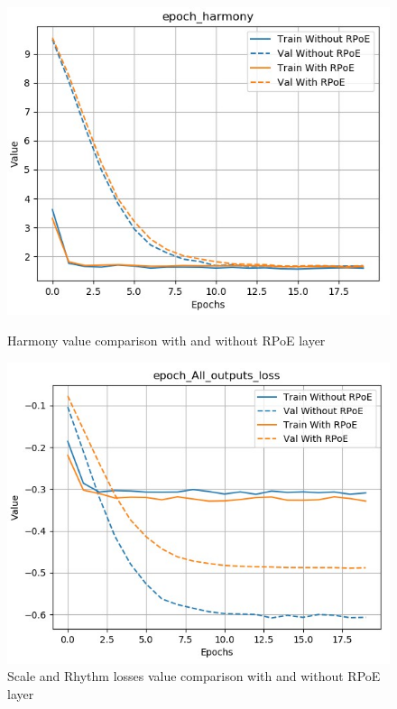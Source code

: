 \documentclass[12pt]{report}
\begin{document}
\begin{figure}[htbp]
    \begin{minipage}{0.5\textwidth}
        \begin{center}
            \includegraphics[width=\textwidth]{images/experiences/rpoe-rnn/harmony-comparison-rpoe.jpg}
            \caption{Harmony value comparison with and without RPoE layer}
            \label{fig:harmony-comparison-rpoe}
        \end{center}
    \end{minipage} \hfill
    \begin{minipage}{0.5 \textwidth}
        \begin{center}
            \includegraphics[width=\textwidth]{images/experiences/rpoe-rnn/all-output-comparison-rpoe.jpg}
            \caption{Scale and Rhythm losses value comparison with and without RPoE layer}
            \label{fig:all-output-comparison-rpoe}
        \end{center}
    \end{minipage}
\end{figure}
\end{document}
